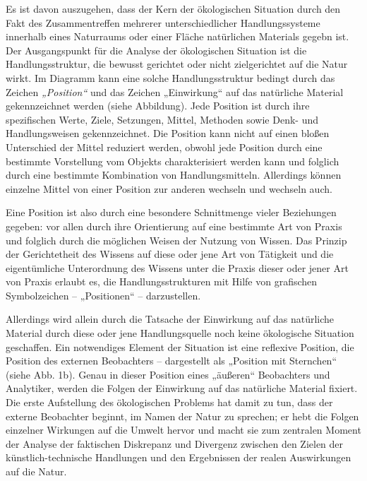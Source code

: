 \documentclass[11pt,a4paper]{article}
\begin{document}
Es ist davon auszugehen, dass der Kern der ökologischen Situation durch den
Fakt des Zusammentreffen mehrerer unterschiedlicher Handlungssysteme innerhalb
eines Naturraums oder einer Fläche natürlichen Materials gegebn ist. Der
Ausgangspunkt für die Analyse der ökologischen Situation ist die
Handlungsstruktur, die bewusst gerichtet oder nicht zielgerichtet auf die
Natur wirkt. Im Diagramm kann eine solche Handlungsstruktur bedingt durch das
Zeichen \emph{„Position“} und das Zeichen „Einwirkung“ auf das natürliche
Material gekennzeichnet werden (siehe Abbildung). Jede Position ist durch ihre
spezifischen Werte, Ziele, Setzungen, Mittel, Methoden sowie Denk- und
Handlungsweisen gekennzeichnet. Die Position kann nicht auf einen bloßen
Unterschied der Mittel reduziert werden, obwohl jede Position durch eine
bestimmte Vorstellung vom Objekts charakterisiert werden kann und folglich
durch eine bestimmte Kombination von Handlungsmitteln. Allerdings können
einzelne Mittel von einer Position zur anderen wechseln und wechseln auch.

Eine Position ist also durch eine besondere Schnittmenge vieler Beziehungen
gegeben: vor allen durch ihre Orientierung auf eine bestimmte Art von Praxis
und folglich durch die möglichen Weisen der Nutzung von Wissen. Das Prinzip
der Gerichtetheit des Wissens auf diese oder jene Art von Tätigkeit und die
eigentümliche Unterordnung des Wissens unter die Praxis dieser oder jener Art
von Praxis erlaubt es, die Handlungsstrukturen mit Hilfe von grafischen
Symbolzeichen -- „Positionen“ -- darzustellen.

Allerdings wird allein durch die Tatsache der Einwirkung auf das natürliche
Material durch diese oder jene Handlungsquelle noch keine ökologische
Situation geschaffen. Ein notwendiges Element der Situation ist eine reflexive
Position, die Position des externen Beobachters -- dargestellt als „Position
mit Sternchen“ (siehe Abb. 1b). Genau in dieser Position eines „äußeren“
Beobachters und Analytiker, werden die Folgen der Einwirkung auf das
natürliche Material fixiert. Die erste Aufstellung des ökologischen Problems
hat damit zu tun, dass der externe Beobachter beginnt, im Namen der Natur zu
sprechen; er hebt die Folgen einzelner Wirkungen auf die Umwelt hervor und
macht sie zum zentralen Moment der Analyse der faktischen Diskrepanz und
Divergenz zwischen den Zielen der künstlich-technische Handlungen und den
Ergebnissen der realen Auswirkungen auf die Natur.
\end{document}

